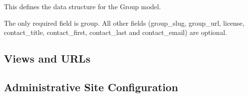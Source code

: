 \documentclass[letterpaper,10pt,english]{sphinxmanual}
\begin{document}
\begin{fulllineitems}
\label{api:groups.models.Group}
This defines the data structure for the Group model.

The only required field is group.
All other fields (group\_slug, group\_url, license, contact\_title, contact\_first, contact\_last and contact\_email) are optional.

\begin{fulllineitems}
\label{api:groups.models.Group.DoesNotExist}
\end{fulllineitems}


\begin{fulllineitems}
\label{api:groups.models.Group.MultipleObjectsReturned}
\end{fulllineitems}


\begin{fulllineitems}
\label{api:groups.models.Group.get_contact_title_display}
\end{fulllineitems}


\begin{fulllineitems}
\label{api:groups.models.Group.license}
\end{fulllineitems}


\end{fulllineitems}



\subsection{Views and URLs}
\label{api:id10}\label{api:module-groups.views}

\subsection{Administrative Site Configuration}
\label{api:id11}\label{api:module-groups.admin}
\end{document}
